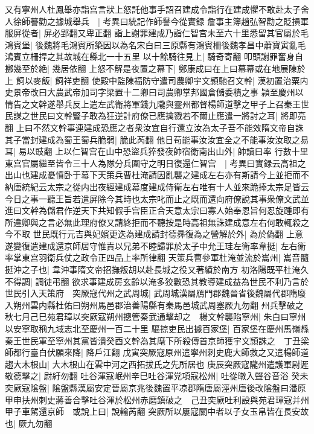 又有寧州人杜鳳舉亦詣宫言狀上怒託他事手詔召建成令詣行在建成懼不敢赴太子舍人徐師謩勸之據城舉兵　|{
	考異曰統記作師譽今從實録}
詹事主簿趙弘智勸之貶損軍服屏從者|{
	屏必郢翻又卑正翻}
詣上謝罪建成乃詣仁智宫未至六十里悉留其官屬於毛鴻賓堡|{
	後魏將毛鴻賓所築因以為名宋白曰三原縣有鴻賓柵後魏孝昌中蕭寶寅亂毛鴻賓立柵捍之其故城在縣北一十五里}
以十餘騎往見上|{
	騎奇寄翻}
叩頭謝罪奮身自擲幾至於絶|{
	幾居依翻}
上怒不解是夜置之幕下|{
	鄭康成曰在上曰幕幕或在地展陳於上}
飼以麥飯|{
	飼祥吏翻}
使殿中監陳福防守遣司農卿宇文頴馳召文幹|{
	漢初置治粟内史景帝改曰大農武帝加司字梁置十二卿曰司農卿掌邦國倉儲委積之事}
頴至慶州以情告之文幹遂舉兵反上遣左武衛將軍錢九隴與靈州都督楊師道擊之甲子上召秦王世民謀之世民曰文幹豎子敢為狂逆計府僚已應擒戮若不爾止應遣一將討之耳|{
	將即亮翻}
上曰不然文幹事連建成恐應之者衆汝宜自行還立汝為太子吾不能效隋文帝自誅其子當封建成為蜀王蜀兵脆弱|{
	脆此芮翻}
他日苟能事汝汝宜全之不能事汝汝取之易耳|{
	易以豉翻}
上以仁智宫在山中恐盜兵猝發夜帥宿衛南出山外|{
	帥讀曰率}
行數十里東宫官屬繼至皆令三十人為隊分兵圍守之明日復還仁智宫　|{
	考異曰實録云高祖之出山也建成憂憤卧于幕下天策兵曹杜淹請因亂襲之建成左右亦有斯請今上並拒而不納唐統紀云太宗之從内出夜經建成幕度建成侍衛左右唯有十人並來跪捧太宗足皆云今日之事一聽王旨若遣屏除今其時也太宗叱而止之既而還向府僚說其事衆僚文武並進曰文幹為儲君作逆天下共知假手宫臣正合天意太宗曰寡人始奉恩旨何忍旋踵即有所違卿與之言必無此理府僚又請終拒而不聽按是時高祖無誅建成意左右何敢輒殺之今不取}
世民既行元吉與妃嬪更迭為建成請封德彞復為之營解於外|{
	為於偽翻}
上意遂變復遣建成還京師居守惟責以兄弟不睦歸罪於太子中允王珪左衛率韋挺|{
	左右衛率掌東宫羽衛兵仗之政令正四品上率所律翻}
天策兵曹參軍杜淹並流於巂州|{
	巂音髓}
挺沖之子也|{
	韋沖事隋文帝招撫叛胡以赴長城之役又著績於南方}
初洛陽既平杜淹久不得調|{
	調徒弔翻}
欲求事建成房玄齡以淹多狡數恐其教導建成益為世民不利乃言於世民引入天策府　突厥寇代州之武周城|{
	武周城漢屬鴈門郡魏晉省後魏屬代郡隋廢入朔州雲内縣杜佑曰朔州馬邑郡治善陽縣有秦馬邑城武周塞厥九勿翻}
州兵擊破之　秋七月己巳苑君璋以突厥寇朔州摠管秦武通擊却之　楊文幹襲陷寧州|{
	朱白曰寧州以安寧取稱九域志北至慶州一百二十里}
驅掠吏民出據百家堡|{
	百家堡在慶州馬嶺縣}
秦王世民軍至寧州其黨皆潰癸酉文幹為其麾下所殺傳首京師獲宇文頴誅之　丁丑梁師都行臺白伏願來降|{
	降戶江翻}
戊寅突厥寇原州遣寧州刺史鹿大師救之又遣楊師道趨大木根山|{
	大木根山在雲中河之西拓拔氏之先所居也}
庚辰突厥寇隴州遣護軍尉遲敬德擊之|{
	尉紆勿翻}
吐谷渾寇岷州辛巳吐谷渾党項寇松州|{
	吐從暾入聲谷音浴}
癸未突厥寇隂盤|{
	隂盤縣漢屬安定晉屬京兆後魏置平凉郡隋唐屬涇州唐後改隂盤曰潘原}
甲申扶州刺史蔣善合擊吐谷渾於松州赤磨鎮破之　己丑突厥吐利設與苑君璋寇并州　甲子車駕還京師　或說上曰|{
	說輸芮翻}
突厥所以屢寇關中者以子女玉帛皆在長安故也|{
	厥九勿翻}
